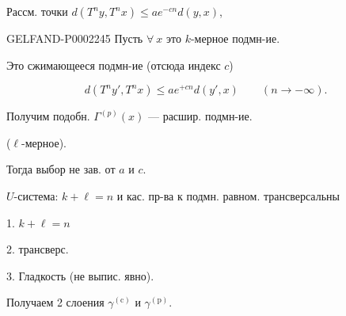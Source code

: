 Рассм. точки $d(T^n y,T^n x)\leq ae^{-cn}d(y,x)$,



\begin{GelfandAdjacentEvidence}{GELFAND-P000224}{5}
Пусть $\forall\ x$ это $k$-мерное подмн-ие.







\end{GelfandAdjacentEvidence}

Это сжимающееся подмн-ие (отсюда индекс \underline{\underline{$c$}})



\begin{equation*}
 d(T^n y',T^n x)\leq ae^{+cn}d(y',x)
 \qquad(n\longrightarrow-\infty).
\end{equation*}



Получим подобн. $\Gamma^{(p)}(x)$ — расшир. подмн-ие.

($\ell$-мерное).



Тогда выбор не зав. от $a$ и $c$.





$U$-система:
$k+\ell=n$ и кас. пр-ва к подмн. равном. трансверсальны



1. $k+\ell=n$

2. трансверс.

3. Гладкость (не выпис. явно).



Получаем 2 слоения $\gamma^{(\mathrm{c})}$ и $\gamma^{(\mathrm{p})}$.



